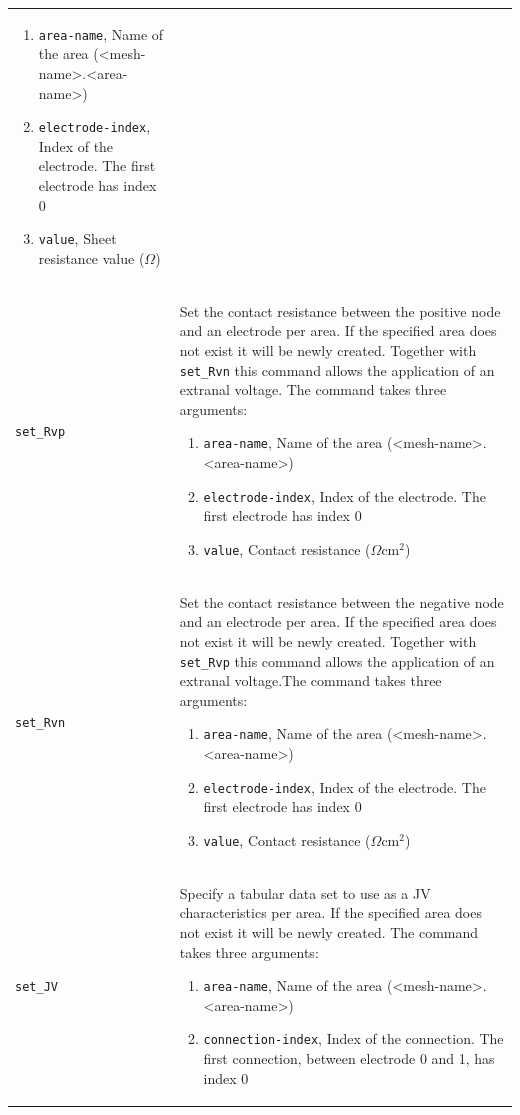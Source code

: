 \documentclass[noshowpacs,preprintnumbers,amsmath,amssymb, letter]{revtex4}
\begin{document}
\begin{longtable}{p{}p{}}
\begin{enumerate}
\item \texttt{area-name}, Name of the area (\textless mesh-name\textgreater .\textless area-name\textgreater )
\item \texttt{electrode-index}, Index of the electrode. The first electrode has index 0
\item \texttt{value}, Sheet resistance value ($\Omega$)
\end{enumerate}\\
\texttt{set\_Rvp}	&  Set the contact resistance between the positive node and an electrode per area. If the specified area does not exist it will be newly created. Together with \texttt{set\_Rvn} this command allows the application of an extranal voltage. The command takes three arguments:
\begin{enumerate}
\item \texttt{area-name}, Name of the area (\textless mesh-name\textgreater .\textless area-name\textgreater )
\item \texttt{electrode-index}, Index of the electrode. The first electrode has index 0
\item \texttt{value}, Contact resistance ($\Omega \text{cm}^2$)
\end{enumerate}\\
\texttt{set\_Rvn}	&  Set the contact resistance between the negative node and an electrode per area. If the specified area does not exist it will be newly created. Together with \texttt{set\_Rvp} this command allows the application of an extranal voltage.The command takes three arguments:
\begin{enumerate}
\item \texttt{area-name}, Name of the area (\textless mesh-name\textgreater .\textless area-name\textgreater )
\item \texttt{electrode-index}, Index of the electrode. The first electrode has index 0
\item \texttt{value}, Contact resistance ($\Omega \text{cm}^2$)
\end{enumerate}\\
\texttt{set\_JV}	&  Specify a tabular data set to use as a JV characteristics per area. If the specified area does not exist it will be newly created. The command takes three arguments:
\begin{enumerate}
\item \texttt{area-name}, Name of the area (\textless mesh-name\textgreater .\textless area-name\textgreater )
\item \texttt{connection-index}, Index of the connection. The first connection, between electrode 0 and 1,  has index 0

\end{enumerate}
\end{longtable}
\end{document}
